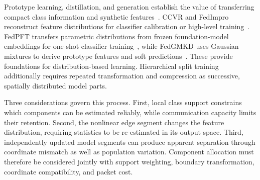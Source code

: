 Prototype learning, distillation, and generation establish the value of transferring compact class information and synthetic features~\cite{tan2022fedproto,lin2020ensemble,zhu2021data}. CCVR and FedImpro reconstruct feature distributions for classifier calibration or high-level training~\cite{luo2021ccvr,tang2024fedimpro}. FedPFT transfers parametric distributions from frozen foundation-model embeddings for one-shot classifier training~\cite{beitollahi2025fedpft}, while FedGMKD uses Gaussian mixtures to derive prototype features and soft predictions~\cite{zhang2024fedgmkd}. These provide foundations for distribution-based learning. Hierarchical split training additionally requires repeated transformation and compression as successive, spatially distributed model parts.

Three considerations govern this process. First, local class support constrains which components can be estimated reliably, while communication capacity limits their retention. Second, the nonlinear edge segment changes the feature distribution, requiring statistics to be re-estimated in its output space. Third, independently updated model segments can produce apparent separation through coordinate mismatch as well as population variation. Component allocation must therefore be considered jointly with support weighting, boundary transformation, coordinate compatibility, and packet cost.

